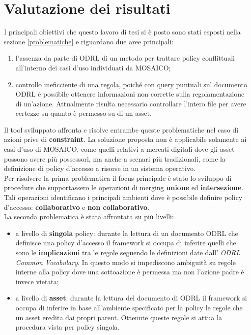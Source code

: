 \documentclass[12pt,a4paper,twoside]{book}
\begin{document}
\chapter{Valutazione dei risultati}
I principali obiettivi che questo lavoro di tesi si è posto sono stati esposti nella sezione \ref{problematiche} e riguardano due aree principali:
\begin{enumerate}
\item l'assenza da parte di ODRL di un metodo per trattare policy conflittuali all'interno dei casi d'uso individuati da MOSAICO;
\item controllo ineficciente di una regola, poiché con query puntuali sul documento ODRL è possibile ottenere informazioni non corrette sulla regolamentazione di un'azione. Attualmente risulta necessario controllare l'intero file per avere certezze su quanto è permesso su di un asset.
\end{enumerate}
Il tool sviluppato affronta e risolve entrambe queste problematiche nel caso di azioni prive di \textbf{constraint}. La soluzione proposta non è applicabile solamente ai casi d'uso di MOSAICO, come quelli relativi a mercati digitali dove gli asset possono avere più possessori, ma anche a scenari più tradizionali, come la definizione di policy d'accesso a risorse in un sistema operativo.\\
Per risolvere la prima problematica il focus principale è stato lo sviluppo di procedure che supportassero le operazioni di merging \textbf{unione} ed \textbf{intersezione}. Tali operazioni identificano i principali ambienti dove è possibile definire policy d'accesso: \textbf{collaborativo} e \textbf{non collaborativo}.\\
La seconda problematica è stata affrontata su più livelli:
\begin{itemize}
\item a livello di \textbf{singola} policy: durante la lettura di un documento ODRL che definisce una policy d'accesso il framework si occupa di inferire quelli che sono le \textbf{implicazioni} tra le regole seguendo le definizioni date dall' \textit{ODRL Common Vocabulary}. In questo modo si impediscono ambiguità su regole interne alla policy dove una sottoazione è permessa ma non l'azione padre è invece vietata;
\item a livello di \textbf{asset}: durante la lettura del documento di ODRL il framework si occupa di inferire in base all'ambiente specificato per la policy le regole che un asset eredita dai propri parent. Ottenute queste regole si attua la procedura vista per policy singola.
\end{itemize}
\end{document}
